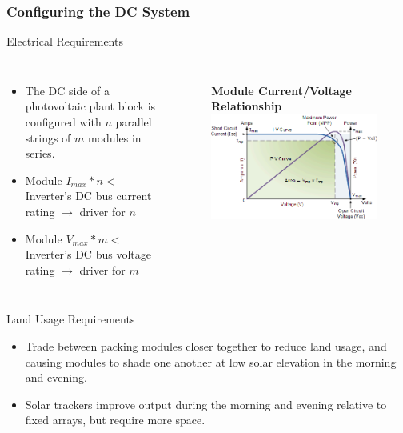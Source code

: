 \documentclass[aspectratio=169]{beamer}
\begin{document}
\begin{frame}
  \frametitle{Configuring the DC System}
  \begin{block}{Electrical Requirements}
    \begin{columns}
      \begin{itemize}
      \item The DC side of a photovoltaic plant block is configured
        with $n$ parallel strings of $m$ modules in series.
      \item Module $I_{max} * n <$ Inverter's DC bus current rating
        $\rightarrow$ driver for $n$
      \item Module $V_{max} * m <$ Inverter's DC bus voltage rating
        $\rightarrow$ driver for $m$
      \end{itemize}

      \begin{figure}
        \textbf{Module Current/Voltage Relationship}
        \includegraphics[width=0.75\linewidth]{IV_Curve.png}
      \end{figure}
    \end{columns}
  \end{block}
  \begin{block}{Land Usage Requirements}
    \begin{itemize}
    \item Trade between packing modules closer together to reduce land
      usage, and causing modules to shade one another at low solar
      elevation in the morning and evening.
    \item Solar trackers improve output during the morning and
      evening relative to fixed arrays, but require more space.
    \end{itemize}
  \end{block}
\end{frame}
\end{document}
